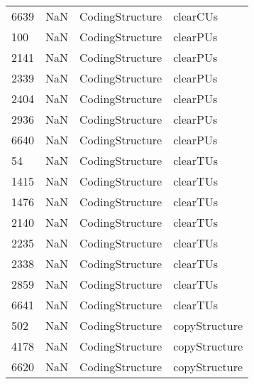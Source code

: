 \begin{tabular}{llll}
6639 &                   NaN &            CodingStructure &                                  clearCUs \\
100  &                   NaN &            CodingStructure &                                  clearPUs \\
2141 &                   NaN &            CodingStructure &                                  clearPUs \\
2339 &                   NaN &            CodingStructure &                                  clearPUs \\
2404 &                   NaN &            CodingStructure &                                  clearPUs \\
2936 &                   NaN &            CodingStructure &                                  clearPUs \\
6640 &                   NaN &            CodingStructure &                                  clearPUs \\
54   &                   NaN &            CodingStructure &                                  clearTUs \\
1415 &                   NaN &            CodingStructure &                                  clearTUs \\
1476 &                   NaN &            CodingStructure &                                  clearTUs \\
2140 &                   NaN &            CodingStructure &                                  clearTUs \\
2235 &                   NaN &            CodingStructure &                                  clearTUs \\
2338 &                   NaN &            CodingStructure &                                  clearTUs \\
2859 &                   NaN &            CodingStructure &                                  clearTUs \\
6641 &                   NaN &            CodingStructure &                                  clearTUs \\
502  &                   NaN &            CodingStructure &                             copyStructure \\
4178 &                   NaN &            CodingStructure &                             copyStructure \\
6620 &                   NaN &            CodingStructure &                             copyStructure \\

\end{tabular}
